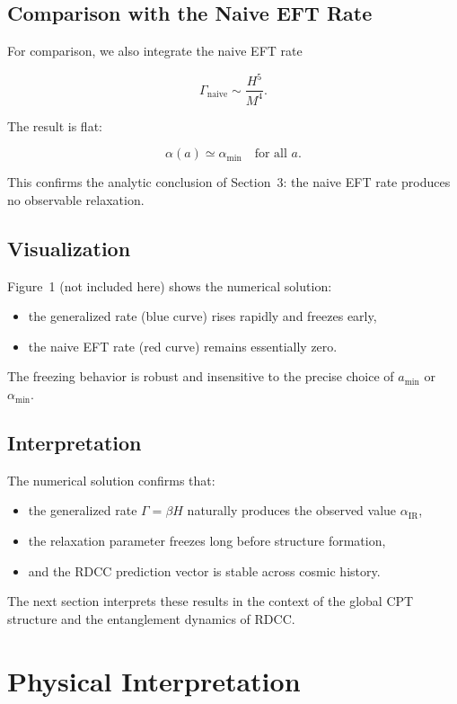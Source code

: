 \documentclass[11pt,a4paper]{article}
\begin{document}
\subsection{Comparison with the Naive EFT Rate}

For comparison, we also integrate the naive EFT rate


\[
    \Gamma_{\mathrm{naive}} \sim \frac{H^5}{M^4}.
\]


The result is flat:


\[
    \alpha(a) \simeq \alpha_{\min}
    \quad\text{for all } a.
\]


This confirms the analytic conclusion of Section~3: the naive EFT rate produces no observable
relaxation.

\subsection{Visualization}

Figure~1 (not included here) shows the numerical solution:
\begin{itemize}
    \item the generalized rate (blue curve) rises rapidly and freezes early,
    \item the naive EFT rate (red curve) remains essentially zero.
\end{itemize}
The freezing behavior is robust and insensitive to the precise choice of $a_{\min}$ or
$\alpha_{\min}$.

\subsection{Interpretation}

The numerical solution confirms that:
\begin{itemize}
    \item the generalized rate $\Gamma = \beta H$ naturally produces the observed value
    $\alpha_{\mathrm{IR}}$,
    \item the relaxation parameter freezes long before structure formation,
    \item and the RDCC prediction vector is stable across cosmic history.
\end{itemize}
The next section interprets these results in the context of the global CPT structure and the
entanglement dynamics of RDCC.

\section{Physical Interpretation}
\end{document}
